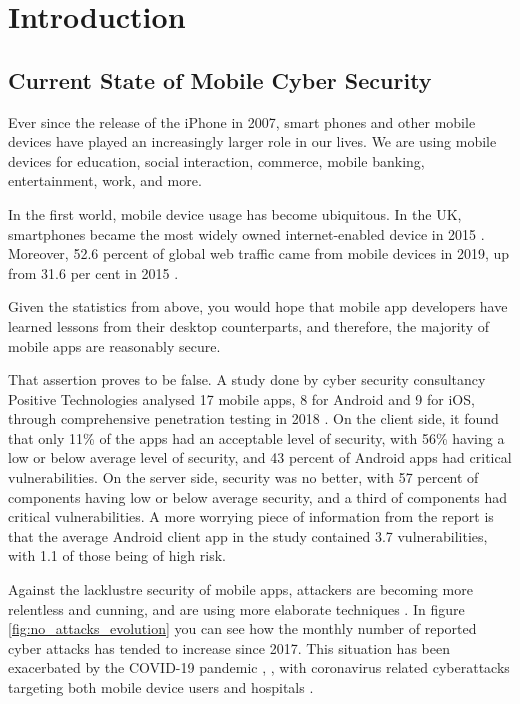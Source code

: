 \chapter{Introduction}
	\label{chap:intro}
	
	\section{Current State of Mobile Cyber Security}
		\label{sec:intro_motivation} 
		
		Ever since the release of the iPhone in 2007, smart phones and other mobile devices have played an increasingly larger role in our lives. We are using mobile devices for education, social interaction, commerce, mobile banking, entertainment, work, and more. 
		
		In the first world, mobile device usage has become ubiquitous. In the UK, smartphones became the most widely owned internet-enabled device in 2015 \cite{ofcom_coms_report}. Moreover, 52.6 percent of global web traffic came from mobile devices in 2019, up from 31.6 per cent in 2015 \cite{statista_mobile_web_traffic}. 
		
		Given the statistics from above, you would hope that mobile app developers have learned lessons from their desktop counterparts, and therefore, the majority of mobile apps are reasonably secure.
		
		That assertion proves to be false. A study done by cyber security consultancy Positive Technologies analysed 17 mobile apps, 8 for Android and 9 for iOS, through comprehensive penetration testing in 2018 \cite{pt_mobile_apps_2019}. On the client side, it found that only 11\% of the apps had an acceptable level of security, with 56\% having a low or below average level of security, and 43 percent of Android apps had critical vulnerabilities. On the server side, security was no better, with 57 percent of components having low or below average security, and a third of components had critical vulnerabilities. A more worrying piece of information from the report is that the average Android client app in the study contained 3.7 vulnerabilities, with 1.1 of those being of high risk.
		
		Against the lacklustre security of mobile apps, attackers are becoming more relentless and cunning, and are using more elaborate techniques \cite{pt_threatscape_2018}. In figure \ref{fig:no_attacks_evolution} you can see
		how the monthly number of reported cyber attacks has tended to increase since 2017. This situation has been exacerbated by the COVID-19 pandemic \cite{fbi_covid_fraud}, \cite{guardian_covid_attack}, with coronavirus related cyberattacks targeting both mobile device users \cite{canada_covid_attack} and hospitals \cite{czech_hospital_covid_attack}.
		
